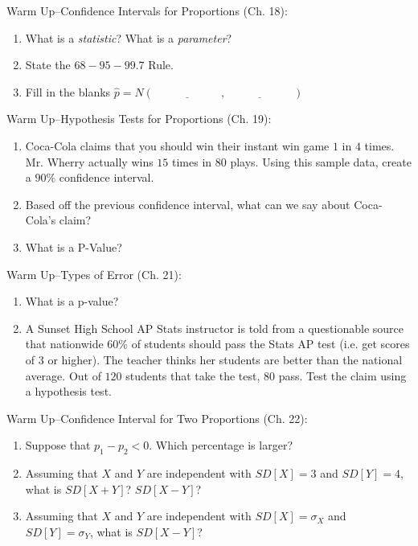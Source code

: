 \documentclass[12pt]{amsart}
\theoremstyle{definition}
\begin{document}
 \begin{framed}
 Warm Up--Confidence Intervals for Proportions (Ch. 18):
 \begin{enumerate}
 \item What is a \emph{statistic}? What is a \emph{parameter}?
 \item State the $68-95-99.7$ Rule.
 \item Fill in the blanks $\hat{p}=N(\underline{\hspace{1in}},\underline{\hspace{1in}})$
 
 \end{enumerate}
 \end{framed}

 \begin{framed}
 Warm Up--Hypothesis Tests for Proportions (Ch. 19):
 \begin{enumerate}
 \item Coca-Cola claims that you should win their instant win game $1$ in $4$ times. Mr. Wherry actually wins $15$ times in $80$ plays. Using this sample data, create a $90\%$ confidence interval.
 \item Based off the previous confidence interval, what can we say about Coca-Cola's claim?
 \item What is a P-Value?
 
 \end{enumerate}
 \end{framed}

 \begin{framed}
 Warm Up--Types of Error (Ch. 21):
 \begin{enumerate}
 \item What is a p-value?
 \item A Sunset High School AP Stats instructor is told from a questionable source that nationwide $60\%$ of students should pass the Stats AP test (i.e. get scores of $3$ or higher). The teacher thinks her students are better than the national average. Out of $120$ students that take the test, $80$ pass. Test the claim using a hypothesis test.
 \end{enumerate}
 \end{framed}
 
  \begin{framed}
  Warm Up--Confidence Interval for Two Proportions (Ch. 22):
  \begin{enumerate}
  \item Suppose that $p_1-p_2<0$. Which percentage is larger?
  \item Assuming that $X$ and $Y$ are independent with $SD[X]=3$ and $SD[Y]=4$, what is $SD[X+Y]$? $SD[X-Y]$?
  \item Assuming that $X$ and $Y$ are independent with $SD[X]=\sigma_X$ and $SD[Y]=\sigma_Y$, what is $SD[X-Y]$?
  \end{enumerate}
  \end{framed}
  
\end{document}
